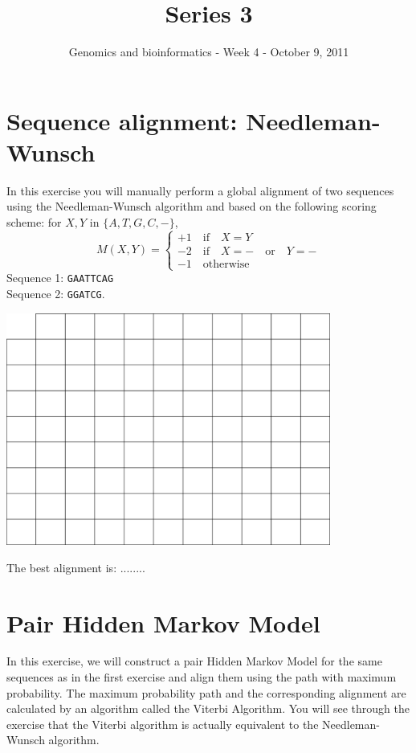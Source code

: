 \documentclass[a4paper,11pt]{article}
\title{Series 3}
\date{}
\author{Genomics and bioinformatics - Week 4 - October 9, 2011}
\begin{document}
\maketitle


\section{Sequence alignment: Needleman-Wunsch}
In this exercise you will manually perform a global alignment of two sequences using the
Needleman-Wunsch algorithm and based on the following scoring scheme: for $X,Y$ in $\{A,T,G,C,-\}$, 
$$
M(X,Y) = \left\{ 
\begin{array}{l}
	+1 \quad\text{if}\quad X = Y \\
	-2 \quad\text{if}\quad X = - \quad\text{or}\quad Y = - \\
	-1 \quad \text{otherwise}
\end{array} \right.
$$
Sequence 1: \texttt{GAATTCAG}\\
Sequence 2: \texttt{GGATCG}.
\vspace{0.5cm}
\begin{center}
\includegraphics[width=0.8\textwidth]{matrix.png}
\end{center}
\vspace{0.5cm}

The best alignment is: ........\\

\newpage 

\section{Pair Hidden Markov Model}

In this exercise, we will construct a pair Hidden Markov Model for
the same sequences as in the first exercise and align them using the
path with maximum probability. The maximum probability path and the 
corresponding alignment are calculated by an algorithm called the Viterbi Algorithm. 
You will see through the exercise that the Viterbi algorithm is actually equivalent
to the Needleman-Wunsch algorithm.
\end{document}
